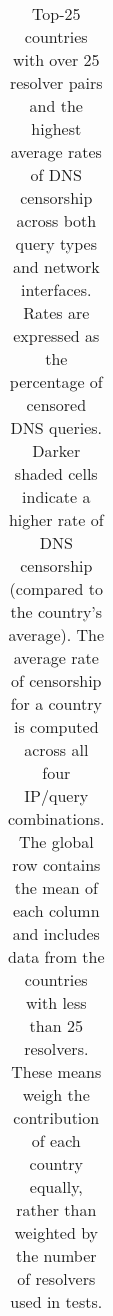 \begin{table}[t]
{\begin{tabular}{lcccccc}
  \bottomrule
  \end{tabular}
  }
  \caption{
  Top-25 countries with over 25 resolver pairs and the highest average
  rates of DNS censorship across both query types and network interfaces. Rates
  are expressed as the percentage of censored DNS queries.
  Darker shaded cells indicate a higher rate of DNS censorship (compared to the
  country's average).  %
  The average rate of censorship for a country is computed across all four
  IP/query combinations.
  The global row contains the mean of each column and includes data from the
  countries with less than 25 resolvers. These means weigh the contribution of
  each country equally, rather than weighted by the number of resolvers used in
  tests.   }
  \label{tab:v4vsv6-prevalence:rates}
\end{table}

